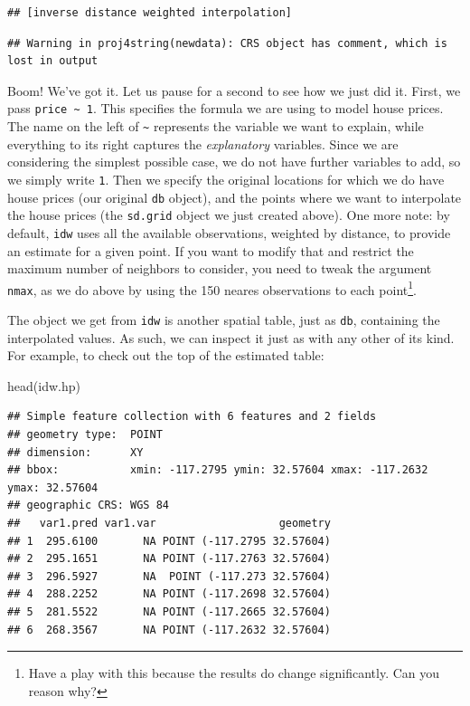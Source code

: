 \documentclass[
]{book}
\newenvironment{Shaded}{\begin{snugshade}}{\end{snugshade}}
\newcommand{\FunctionTok}[1]{\textcolor[rgb]{0.00,0.00,0.00}{#1}}
\newcommand{\NormalTok}[1]{#1}
\begin{document}
\begin{verbatim}
## [inverse distance weighted interpolation]
\end{verbatim}

\begin{verbatim}
## Warning in proj4string(newdata): CRS object has comment, which is lost in output
\end{verbatim}

Boom! We've got it. Let us pause for a second to see how we just did it. First, we pass \texttt{price\ \textasciitilde{}\ 1}. This specifies the formula we are using to model house prices. The name on the left of \texttt{\textasciitilde{}} represents the variable we want to explain, while everything to its right captures the \emph{explanatory} variables. Since we are considering the simplest possible case, we do not have further variables to add, so we simply write \texttt{1}. Then we specify the original locations for which we do have house prices (our original \texttt{db} object), and the points where we want to interpolate the house prices (the \texttt{sd.grid} object we just created above). One more note: by default, \texttt{idw} uses all the available observations, weighted by distance, to provide an estimate for a given point. If you want to modify that and restrict the maximum number of neighbors to consider, you need to tweak the argument \texttt{nmax}, as we do above by using the 150 neares observations to each point\footnote{Have a play with this because the results do change significantly. Can you reason why?}.

The object we get from \texttt{idw} is another spatial table, just as \texttt{db}, containing the interpolated values. As such, we can inspect it just as with any other of its kind. For example, to check out the top of the estimated table:

\begin{Shaded}
\begin{Highlighting}[]
\FunctionTok{head}\NormalTok{(idw.hp)}
\end{Highlighting}
\end{Shaded}

\begin{verbatim}
## Simple feature collection with 6 features and 2 fields
## geometry type:  POINT
## dimension:      XY
## bbox:           xmin: -117.2795 ymin: 32.57604 xmax: -117.2632 ymax: 32.57604
## geographic CRS: WGS 84
##   var1.pred var1.var                   geometry
## 1  295.6100       NA POINT (-117.2795 32.57604)
## 2  295.1651       NA POINT (-117.2763 32.57604)
## 3  296.5927       NA  POINT (-117.273 32.57604)
## 4  288.2252       NA POINT (-117.2698 32.57604)
## 5  281.5522       NA POINT (-117.2665 32.57604)
## 6  268.3567       NA POINT (-117.2632 32.57604)
\end{verbatim}
\end{document}
